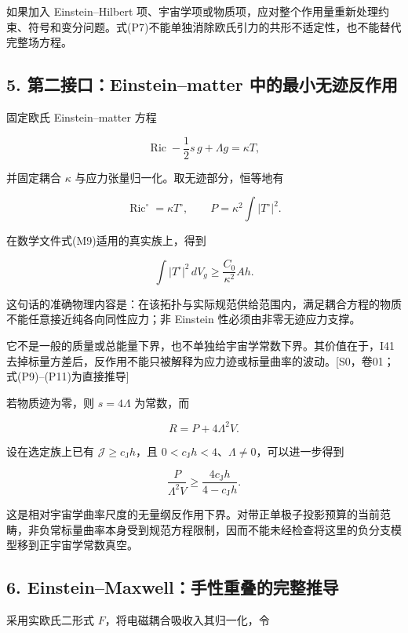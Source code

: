 \documentclass[UTF8,a4paper,11pt,fontset=fandol]{ctexart}
\begin{document}
如果加入 Einstein--Hilbert
项、宇宙学项或物质项，应对整个作用量重新处理约束、符号和变分问题。式(P7)不能单独消除欧氏引力的共形不适定性，也不能替代完整场方程。

\subsection{5. 第二接口：Einstein--matter
中的最小无迹反作用}\label{ux7b2cux4e8cux63a5ux53e3einsteinmatter-ux4e2dux7684ux6700ux5c0fux65e0ux8ff9ux53cdux4f5cux7528}

固定欧氏 Einstein--matter 方程

\[
\operatorname{Ric}-\frac12s\,g+\Lambda g=\kappa T,
\tag{P9}
\]

并固定耦合 \(\kappa\) 与应力张量归一化。取无迹部分，恒等地有

\[
\operatorname{Ric}^{\circ}=\kappa T^{\circ},\qquad
P=\kappa^2\int|T^{\circ}|^2.
\tag{P10}
\]

在数学文件式(M9)适用的真实族上，得到

\[
\boxed{\int|T^{\circ}|^2\,dV_g\ge\frac{C_0}{\kappa^2}Ah.}
\tag{P11}
\]

这句话的准确物理内容是：在该拓扑与实际规范供给范围内，满足耦合方程的物质不能任意接近纯各向同性应力；非
Einstein 性必须由非零无迹应力支撑。

它不是一般的质量或总能量下界，也不单独给宇宙学常数下界。其价值在于，I41
去掉标量方差后，反作用不能只被解释为应力迹或标量曲率的波动。{[}S0，卷01；式(P9)--(P11)为直接推导{]}

若物质迹为零，则 \(s=4\Lambda\) 为常数，而

\[
R=P+4\Lambda^2V.
\]

设在选定族上已有 \(\mathcal J\ge c_{\mathrm J}h\)，且
\(0<c_{\mathrm J}h<4\)、\(\Lambda\ne0\)，可以进一步得到

\[
\boxed{
\frac{P}{\Lambda^2V}
\ge\frac{4c_{\mathrm J}h}{4-c_{\mathrm J}h}.
}
\tag{P12}
\]

这是相对宇宙学曲率尺度的无量纲反作用下界。对带正单极子投影预算的当前范畴，非负常标量曲率本身受到规范方程限制，因而不能未经检查将这里的负分支模型移到正宇宙学常数真空。

\subsection{6.
Einstein--Maxwell：手性重叠的完整推导}\label{einsteinmaxwellux624bux6027ux91cdux53e0ux7684ux5b8cux6574ux63a8ux5bfc}

采用实欧氏二形式 \(F\)，将电磁耦合吸收入其归一化，令
\end{document}
